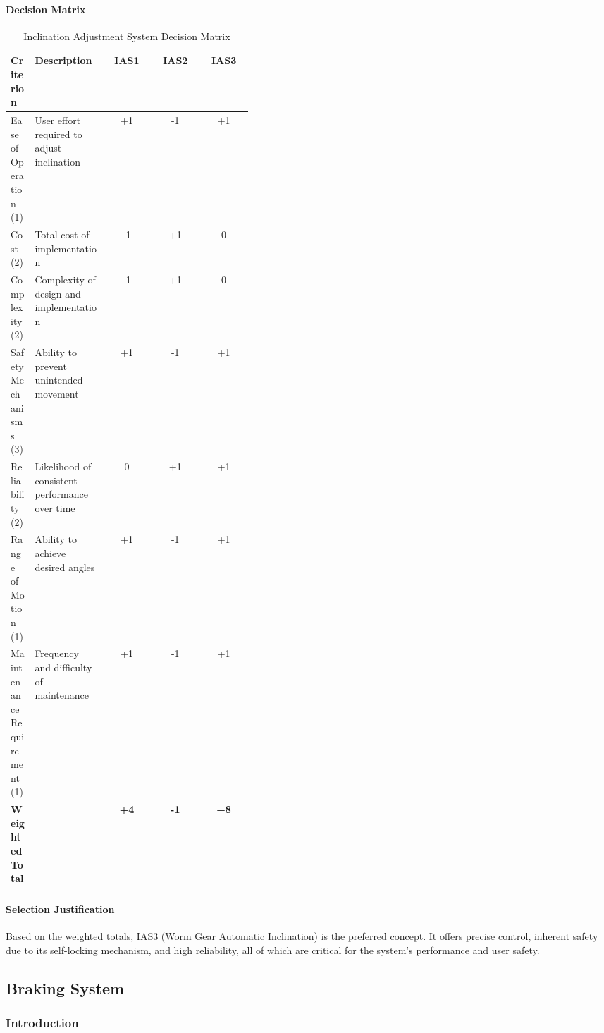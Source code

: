\paragraph{Decision Matrix}

\begin{table}[H]
\centering
\caption{Inclination Adjustment System Decision Matrix}
\label{tab:ias_decision_matrix}
\begin{tabular}{|p{0.1\linewidth}|p{0.3\linewidth}|c|c|c|}
\hline
\textbf{Criterion} & \textbf{Description} & \textbf{IAS1} & \textbf{IAS2} & \textbf{IAS3} \\
\hline
Ease of Operation (1) & User effort required to adjust inclination & +1 & -1 & +1 \\
\hline
Cost (2) & Total cost of implementation & -1 & +1 & 0 \\
\hline
Complexity (2) & Complexity of design and implementation & -1 & +1 & 0 \\
\hline
Safety Mechanisms (3) & Ability to prevent unintended movement & +1 & -1 & +1 \\
\hline
Reliability (2) & Likelihood of consistent performance over time & 0 & +1 & +1 \\
\hline
Range of Motion (1) & Ability to achieve desired angles & +1 & -1 & +1 \\
\hline
Maintenance Requirement (1) & Frequency and difficulty of maintenance & +1 & -1 & +1 \\
\hline
\textbf{Weighted Total} &  & \textbf{+4} & \textbf{-1} & \textbf{+8} \\
\hline
\end{tabular}
\end{table}

\paragraph{Selection Justification}

Based on the weighted totals, IAS3 (Worm Gear Automatic Inclination) is the preferred concept. It offers precise control, inherent safety due to its self-locking mechanism, and high reliability, all of which are critical for the system's performance and user safety.

\subsection{Braking System}

\subsubsection{Introduction}

